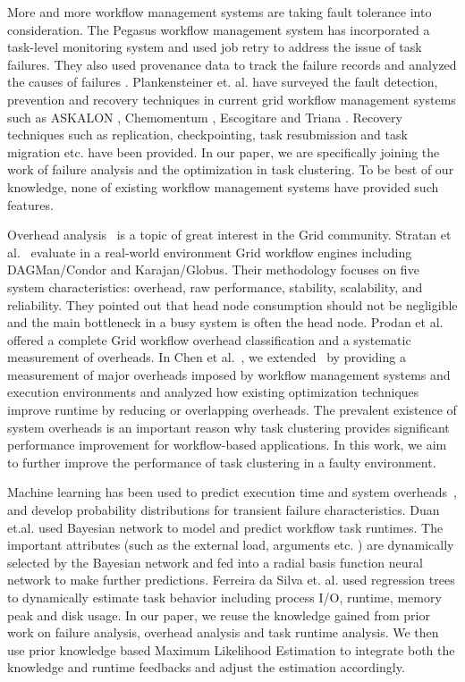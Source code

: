 \documentclass{IOS-Book-Article}
\begin{document}
More and more workflow management systems are taking fault tolerance into consideration. The Pegasus workflow management system \cite{Deelman2004} has incorporated a task-level monitoring system and used job retry to address the issue of task failures. They also used provenance data to track the failure records and analyzed the causes of failures \cite{Samak2011}. Plankensteiner et. al. \cite{plankensteiner2009fault} have surveyed the fault detection, prevention and recovery techniques in current grid workflow management systems such as ASKALON \cite{fahringer2007askalon}, Chemomentum \cite{schuller2008chemomentum}, Escogitare \cite{laforenza2007biological} and Triana \cite{taylor2007triana}. Recovery techniques such as replication, checkpointing, task resubmission  and task migration etc. have been provided. In our paper, we are specifically joining the work of failure analysis and the optimization in task clustering. To be best of our knowledge, none of existing workflow management systems have provided such features. 

Overhead analysis~\cite{Ostberg2011, Prodan2008} is a topic of great interest in the Grid community. Stratan et al.~\cite{Stratan2008} evaluate in a real-world environment Grid workflow engines including DAGMan/Condor and Karajan/Globus. Their methodology focuses on five system characteristics: overhead, raw performance, stability, scalability, and reliability. They pointed out that head node consumption should not be negligible and the main bottleneck in a busy system is often the head node. Prodan et al.~\cite{Prodan2008} offered a complete Grid workflow overhead classification and a systematic measurement of overheads. In Chen et al.~\cite{Chen2011}, we extended~\cite{Prodan2008} by providing a measurement of major overheads imposed by workflow management systems and execution environments and analyzed how existing optimization techniques improve runtime by reducing or overlapping overheads. The prevalent existence of system overheads is an important reason why task clustering provides significant performance improvement for workflow-based applications. In this work, we aim to further improve the performance of task clustering in a faulty environment. 

Machine learning has been used to predict execution time \cite{Rubing2009, 1015660, 1542747, da2013toward} and system overheads~\cite{Chen2011}, and develop probability distributions for transient failure characteristics. Duan et.al. \cite{Rubing2009} used Bayesian network to model and predict workflow task runtimes. The important attributes (such as the external load, arguments etc. ) are dynamically selected by the Bayesian network and fed into a radial basis function neural network to make further predictions. Ferreira da Silva et. al. \cite{da2013toward} used regression trees to dynamically estimate task behavior including process I/O, runtime, memory peak and disk usage. In our paper, we reuse the knowledge gained from prior work on failure analysis, overhead analysis and task runtime analysis. We then use prior knowledge based Maximum Likelihood Estimation to integrate both the knowledge and runtime feedbacks and adjust the estimation accordingly. 
\end{document}
